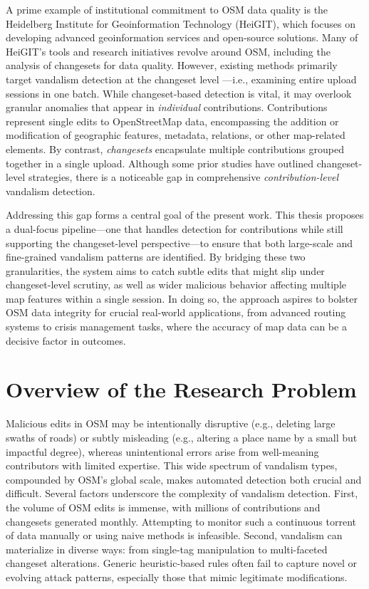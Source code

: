 \documentclass[
    13pt, %
    a4paper, %
    DIV14, %
    listof=totoc, %
    bibliography=totoc, %
    index=totoc, %
    headsepline
]{scrreprt}
\begin{document}
A prime example of institutional commitment to OSM data quality is the Heidelberg Institute for Geoinformation Technology (HeiGIT)\cite{heigit_website}, which focuses on developing advanced geoinformation services and open-source solutions. Many of HeiGIT’s tools and research initiatives revolve around OSM, including the analysis of changesets for data quality. However, existing methods primarily target vandalism detection at the changeset level \cite{Li2021, Yuan2022}—i.e., examining entire upload sessions in one batch. While changeset-based detection is vital, it may overlook granular anomalies that appear in \emph{individual} contributions. Contributions represent single edits to OpenStreetMap data, encompassing the addition or modification of geographic features, metadata, relations, or other map-related elements. By contrast, \emph{changesets} \cite{osm_changesets} encapsulate multiple contributions grouped together in a single upload. Although some prior studies have outlined changeset-level strategies, there is a noticeable gap in comprehensive \emph{contribution-level} vandalism detection.

Addressing this gap forms a central goal of the present work. This thesis proposes a dual-focus pipeline—one that handles detection for contributions while still supporting the changeset-level perspective—to ensure that both large-scale and fine-grained vandalism patterns are identified. By bridging these two granularities, the system aims to catch subtle edits that might slip under changeset-level scrutiny, as well as wider malicious behavior affecting multiple map features within a single session. In doing so, the approach aspires to bolster OSM data integrity for crucial real-world applications, from advanced routing systems to crisis management tasks, where the accuracy of map data can be a decisive factor in outcomes.


\section{Overview of the Research Problem}
\label{sec:overview_problem}

Malicious edits in OSM may be intentionally disruptive (e.g., deleting large swaths of roads) or subtly misleading (e.g., altering a place name by a small but impactful degree), whereas unintentional errors arise from well-meaning contributors with limited expertise. This wide spectrum of vandalism types, compounded by OSM’s global scale, makes automated detection both crucial and difficult. Several factors underscore the complexity of vandalism detection. First, the volume of OSM edits is immense, with millions of contributions and changesets generated monthly. Attempting to monitor such a continuous torrent of data manually or using naive methods is infeasible. Second, vandalism can materialize in diverse ways: from single-tag manipulation to multi-faceted changeset alterations. Generic heuristic-based rules often fail to capture novel or evolving attack patterns, especially those that mimic legitimate modifications.
\end{document}
